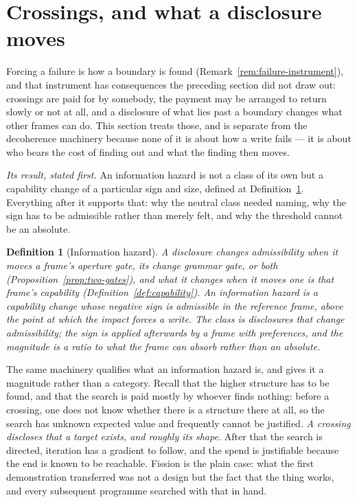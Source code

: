 \documentclass[11pt,a4paper]{article}
\newtheorem{definition}{Definition}[section]
\theoremstyle{remark}\newtheorem{remark}[definition]{Remark}
\begin{document}
\section{Crossings, and what a disclosure moves}\label{sec:crossings}
Forcing a failure is how a boundary is found (Remark~\ref{rem:failure-instrument}), and that instrument
has consequences the preceding section did not draw out: crossings are paid for by somebody, the payment
may be arranged to return slowly or not at all, and a disclosure of what lies past a boundary changes
what other frames can do. This section treats those, and is separate from the decoherence machinery because none of it is about
how a write fails --- it is about who bears the cost of finding out and what the finding then moves.

\emph{Its result, stated first.} An information hazard is not a class of its own but a capability
change of a particular sign and size, defined at Definition~\ref{def:info-hazard}. Everything
after it supports that: why the neutral class needed naming, why the sign has to be
admissible rather than merely felt, and why the threshold cannot be an absolute.

\begin{definition}[Information hazard]\label{def:info-hazard}
A disclosure changes admissibility when it moves a frame's aperture gate, its change grammar gate, or
both (Proposition~\ref{prop:two-gates}), and what it changes when it moves one is that frame's
\emph{capability} (Definition~\ref{def:capability}). An \emph{information hazard} is a capability
change whose negative sign is admissible in the reference frame, above the point at which the impact
forces a write. The class is disclosures that change admissibility; the sign is applied afterwards by
a frame with preferences, and the magnitude is a ratio to what the frame can absorb rather than an
absolute.
\end{definition}

The same machinery qualifies what an information hazard is, and gives it a magnitude rather than a
category. Recall that the higher structure has to be found, and that the search is paid mostly by
whoever finds nothing: before a crossing, one does not know whether there is a structure there at all,
so the search has unknown expected value and frequently cannot be justified. \emph{A crossing discloses
that a target exists, and roughly its shape.} After that the search is directed, iteration has a
gradient to follow, and the spend is justifiable because the end is known to be reachable. Fission is
the plain case: what the first demonstration transferred was not a design but the fact that the thing
works, and every subsequent programme searched with that in hand.
\end{document}
